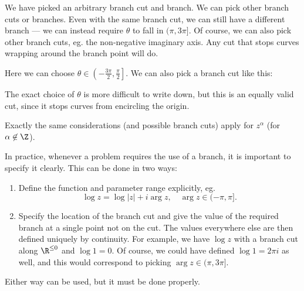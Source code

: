 \documentclass[a4paper]{article}
\begin{document}
We have picked an arbitrary branch cut and branch. We can pick other branch cuts or branches. Even with the same branch cut, we can still have a different branch --- we can instead require $\theta$ to fall in $(\pi, 3\pi]$. Of course, we can also pick other branch cuts, eg. the non-negative imaginary axis. Any cut that stops curves wrapping around the branch point will do.
\begin{center}
\end{center}
Here we can choose $\theta \in \left(-\frac{3\pi}{2}, \frac{\pi}{2}\right]$. We can also pick a branch cut like this:
\begin{center}
\end{center}
The exact choice of $\theta$ is more difficult to write down, but this is an equally valid cut, since it stops curves from encircling the origin.

Exactly the same considerations (and possible branch cuts) apply for $z^\alpha$ (for $\alpha \not\in \Z$).

In practice, whenever a problem requires the use of a branch, it is important to specify it clearly. This can be done in two ways:
\begin{enumerate}
  \item Define the function and parameter range explicitly, eg.
    \[
      \log z = \log|z| + i \arg z, \quad \arg z \in (-\pi, \pi].
    \]
  \item Specify the location of the branch cut and give the value of the required branch at a single point not on the cut. The values everywhere else are then defined uniquely by continuity. For example, we have $\log z$ with a branch cut along $\R^{\leq 0}$ and $\log 1 = 0$. Of course, we could have defined $\log 1 = 2\pi i$ as well, and this would correspond to picking $\arg z \in (\pi, 3 \pi]$.
\end{enumerate}
Either way can be used, but it must be done properly.
\end{document}
